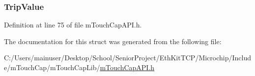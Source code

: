\hypertarget{struct_d_i_r_e_c_t_k_e_y_abc6bec2968b498197fc0e64c3729fb0c}{}
\subsubsection[{Trip\+Value}]{ Trip\+Value}\label{struct_d_i_r_e_c_t_k_e_y_abc6bec2968b498197fc0e64c3729fb0c}


Definition at line 75 of file m\+Touch\+Cap\+A\+P\+I.\+h.



The documentation for this struct was generated from the following file\+:\begin{DoxyCompactItemize}
\item 
C\+:/\+Users/mainuser/\+Desktop/\+School/\+Senior\+Project/\+Eth\+Kit\+T\+C\+P/\+Microchip/\+Include/m\+Touch\+Cap/m\+Touch\+Cap\+Lib/\hyperlink{m_touch_cap_a_p_i_8h}{m\+Touch\+Cap\+A\+P\+I.\+h}\end{DoxyCompactItemize}
